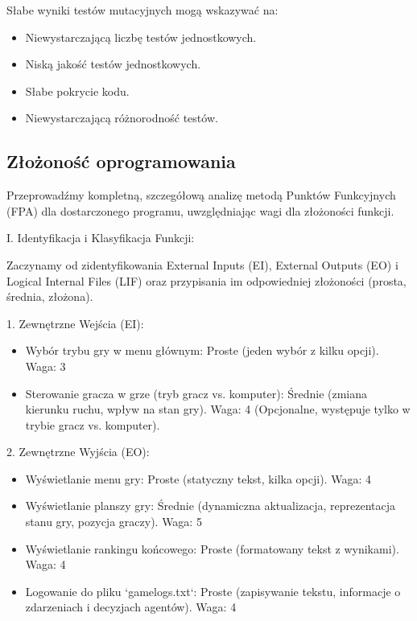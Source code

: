 \documentclass[12pt,a4paper]{article}
\begin{document}
\begin{enumerate}
        Słabe wyniki testów mutacyjnych mogą wskazywać na:
        \begin{itemize}
            \item Niewystarczającą liczbę testów jednostkowych.
            \item Niską jakość testów jednostkowych.
            \item Słabe pokrycie kodu.
            \item Niewystarczającą różnorodność testów.
        \end{itemize}

\end{enumerate}


\subsection*{Złożoność oprogramowania} 
Przeprowadźmy kompletną, szczegółową analizę metodą Punktów Funkcyjnych (FPA) dla dostarczonego programu, uwzględniając wagi dla złożoności funkcji.

I. Identyfikacja i Klasyfikacja Funkcji:

Zaczynamy od zidentyfikowania External Inputs (EI), External Outputs (EO) i Logical Internal Files (LIF) oraz przypisania im odpowiedniej złożoności (prosta, średnia, złożona).

1. Zewnętrzne Wejścia (EI):
\begin{itemize}
    \item Wybór trybu gry w menu głównym: Proste (jeden wybór z kilku opcji). Waga: 3
    \item Sterowanie gracza w grze (tryb gracz vs. komputer): Średnie (zmiana kierunku ruchu, wpływ na stan gry). Waga: 4 (Opcjonalne, występuje tylko w trybie gracz vs. komputer).
\end{itemize} 

2. Zewnętrzne Wyjścia (EO):
\begin{itemize}
    \item Wyświetlanie menu gry: Proste (statyczny tekst, kilka opcji). Waga: 4
    \item Wyświetlanie planszy gry: Średnie (dynamiczna aktualizacja, reprezentacja stanu gry, pozycja graczy). Waga: 5
    \item  Wyświetlanie rankingu końcowego: Proste (formatowany tekst z wynikami). Waga: 4
    \item Logowanie do pliku `game\textunderscore logs.txt`: Proste (zapisywanie tekstu, informacje o zdarzeniach i decyzjach agentów). Waga: 4
\end{itemize} 
\end{document}
